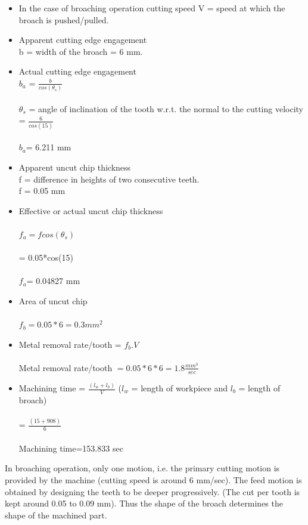 \documentclass[16pt,a4paper]{article}
\begin{document}
\begin{itemize}

\item In the case of broaching operation cutting speed V = speed at which the broach is pushed/pulled.
\item Apparent cutting edge engagement
\\ b = width of the broach  = 6 mm.
\item Actual cutting edge engagement
\\$ b_a$ = $\frac {b}{cos(\theta_s)}$ \\     \\   
$\theta_s$ = angle of inclination of the tooth w.r.t. the normal to the cutting velocity
\\= $\frac {6}{cos(15)}$ \\     
\\$b_a$=   6.211 mm
\item Apparent uncut chip thickness
\\ f = difference in heights of two consecutive teeth.
\\f = 0.05 mm
\item Effective or actual uncut chip thickness \\  
\\$f_a =  f cos (\theta_s)$\\    
\\ =  0.05*cos(15)\\   
\\$f_a$=  0.04827 mm
\item Area of uncut chip \\  
\\$f_b= 0.05 * 6 = 0.3 mm^2$
\item Metal removal rate/tooth = $ f_b.V$\\   
\\Metal removal rate/tooth $= 0.05 * 6 * 6 = 1.8 \frac {mm^3}{sec}$\\     
\item Machining time = $ \frac{(l_w + l_b)}{V}$          ($l_w$ = length of workpiece and $l_b$ = length of broach)   \\    
\\               = $ \frac {( 15 + 908)}{6}$\\   
\\ Machining time=153.833 sec

\end{itemize}

In broaching operation, only one motion, i.e. the primary cutting motion is provided by the machine (cutting speed is around  6 mm/sec). The feed motion is obtained by designing the teeth to be deeper progressively. (The cut per tooth is kept around 0.05 to 0.09 mm). Thus the shape of the broach determines the shape of the machined part.\\   
\end{document}
